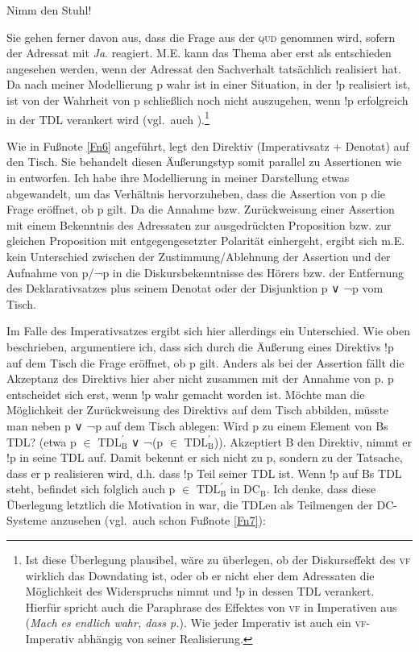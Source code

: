\begin{exe}
	\ex\label{568}  
	Nimm den Stuhl!
\end{exe}
Sie gehen ferner davon aus, dass die Frage aus der \textsc{qud} genommen wird, sofern der Adressat mit \textit{Ja}. reagiert. M.E. kann das Thema aber erst als entschieden angesehen werden, wenn der Adressat den Sachverhalt tatsächlich realisiert hat. Da nach meiner Modellierung p wahr ist in einer Situation, in der !p realisiert ist, ist von der Wahrheit von p schließlich noch nicht auszugehen, wenn !p erfolg\-reich in der TDL verankert wird (vgl.\ auch \citealt[7]{Potts2003}).\footnote{Ist diese Überlegung plausibel, wäre zu überlegen, ob der Diskurseffekt des \textsc{vf} wirklich das Downdating ist, oder ob er nicht eher dem Adressaten die Möglichkeit des Widerspruchs nimmt und !p in dessen TDL verankert. Hierfür spricht auch die Paraphrase des Effektes von \textsc{vf} in Imperativen aus \citet[119]{Hoehle1992} (\textit{Mach es endlich wahr, dass p.}). Wie jeder Imperativ ist auch ein \textsc{vf}-Imperativ abhängig von seiner Realisierung.}

Wie in Fußnote \ref{Fn6} angeführt, legt \citet[323]{Farkas2011} den Direktiv (Imperativsatz + Denotat) auf den Tisch. Sie behandelt diesen Äußerungstyp somit parallel zu Assertionen wie in \citet{Farkas2010} entworfen. Ich habe ihre Modellierung in meiner Darstellung etwas abgewandelt, um das Verhältnis hervorzuheben, dass die Assertion von p die Frage eröffnet, ob p gilt. Da die Annahme bzw. Zurückweisung einer Assertion mit einem Bekenntnis des Adressaten zur ausgedrückten Proposition bzw. zur gleichen Proposition mit entgegengesetzter Polarität einhergeht, ergibt sich m.E. kein Unterschied zwischen der Zustimmung/Ablehnung der Assertion und der Aufnahme von p/¬p in die Diskursbekenntnisse des Hörers bzw. der Entfernung des Deklarativsatzes plus seinem Denotat oder der Disjunktion p ∨ ¬p vom Tisch. 

Im Falle des Imperativsatzes  ergibt sich hier allerdings ein Unterschied. Wie oben beschrieben, argumentiere ich, dass sich durch die Äußerung eines Direktivs !p auf dem Tisch die Frage eröffnet, ob p gilt. Anders als bei der Assertion fällt die Akzeptanz des Direktivs hier aber nicht zusammen mit der Annahme von p. p entscheidet sich erst, wenn !p wahr gemacht worden ist. Möchte man die Möglichkeit der Zurückweisung des Direktivs auf dem Tisch abbilden, müsste man neben p ∨ ¬p auf dem Tisch ablegen: Wird p zu einem Element von Bs TDL? (etwa p $\in$ $\textrm{TDL}^{\prime}_{\textrm{B}}$ ∨ ¬(p $\in$ $\textrm{TDL}^{\prime}_{\textrm{B}}$)). Akzeptiert B den Direktiv, nimmt er !p in seine TDL auf. Damit bekennt er sich nicht zu p, sondern zu der Tatsache, dass er p realisieren wird, d.h. dass !p Teil seiner TDL ist. Wenn !p auf Bs TDL steht, befindet sich folglich auch p $\in$ $\textrm{TDL}^{\prime}_{\textrm{B}}$ in $\textrm{DC}_{\textrm{B}}$. Ich denke, dass diese Überlegung letztlich die Motivation in \citet[223/324]{Farkas2011} war, die TDLen als Teilmengen der DC-Systeme anzusehen (vgl.\ auch schon Fußnote \ref{Fn7}):

